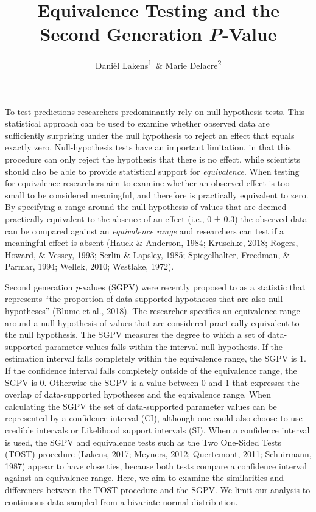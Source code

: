 \documentclass[,man,floatsintext]{apa6}
\title{Equivalence Testing and the Second Generation \emph{P}-Value}
\author{Daniël Lakens\textsuperscript{1}~\& Marie Delacre\textsuperscript{2}}
\date{}
\affiliation{
\vspace{0.5cm}
\textsuperscript{1} Eindhoven University of Technology, Eindhoven, The Netherlands\\\textsuperscript{2} Service of Analysis of the Data, Université Libre de Bruxelles, Belgium}
\begin{document}
\maketitle

To test predictions researchers predominantly rely on null-hypothesis
tests. This statistical approach can be used to examine whether observed
data are sufficiently surprising under the null hypothesis to reject an
effect that equals exactly zero. Null-hypothesis tests have an important
limitation, in that this procedure can only reject the hypothesis that
there is no effect, while scientists should also be able to provide
statistical support for \emph{equivalence}. When testing for equivalence
researchers aim to examine whether an observed effect is too small to be
considered meaningful, and therefore is practically equivalent to zero.
By specifying a range around the null hypothesis of values that are
deemed practically equivalent to the absence of an effect (i.e., 0 ±
0.3) the observed data can be compared against an \emph{equivalence
range} and researchers can test if a meaningful effect is absent (Hauck
\& Anderson, 1984; Kruschke, 2018; Rogers, Howard, \& Vessey, 1993;
Serlin \& Lapsley, 1985; Spiegelhalter, Freedman, \& Parmar, 1994;
Wellek, 2010; Westlake, 1972).

Second generation \emph{p}-values (SGPV) were recently proposed to as a
statistic that represents \enquote{the proportion of data-supported
hypotheses that are also null hypotheses} (Blume et al., 2018). The
researcher specifies an equivalence range around a null hypothesis of
values that are considered practically equivalent to the null
hypothesis. The SGPV measures the degree to which a set of
data-supported parameter values falls within the interval null
hypothesis. If the estimation interval falls completely within the
equivalence range, the SGPV is 1. If the confidence interval falls
completely outside of the equivalence range, the SGPV is 0. Otherwise
the SGPV is a value between 0 and 1 that expresses the overlap of
data-supported hypotheses and the equivalence range. When calculating
the SGPV the set of data-supported parameter values can be represented
by a confidence interval (CI), although one could also choose to use
credible intervals or Likelihood support intervals (SI). When a
confidence interval is used, the SGPV and equivalence tests such as the
Two One-Sided Tests (TOST) procedure (Lakens, 2017; Meyners, 2012;
Quertemont, 2011; Schuirmann, 1987) appear to have close ties, because
both tests compare a confidence interval against an equivalence range.
Here, we aim to examine the similarities and differences between the
TOST procedure and the SGPV. We limit our analysis to continuous data
sampled from a bivariate normal distribution.
\end{document}
